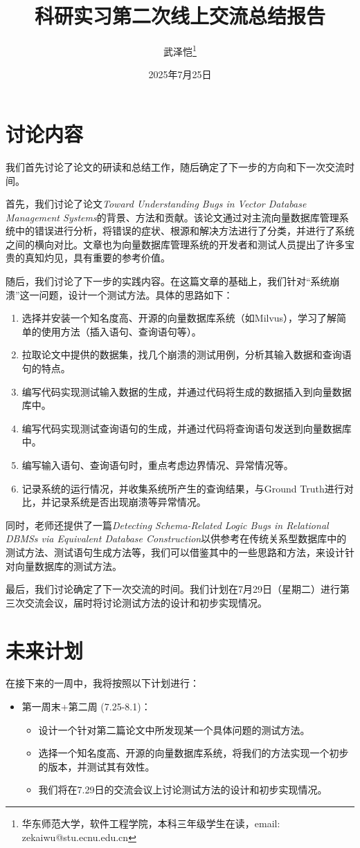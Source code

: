 \documentclass[UTF8]{ctexart}
\title{\heiti 科研实习第二次线上交流总结报告}
\author{武泽恺\footnote{华东师范大学，软件工程学院，本科三年级学生在读，email: zekaiwu@stu.ecnu.edu.cn}}
\date{2025年7月25日}
\begin{document}
\maketitle

\section{讨论内容}

我们首先讨论了论文的研读和总结工作，随后确定了下一步的方向和下一次交流时间。

首先，我们讨论了论文\textit{Toward Understanding Bugs in Vector Database Management Systems}的背景、方法和贡献。该论文通过对主流向量数据库管理系统中的错误进行分析，将错误的症状、根源和解决方法进行了分类，并进行了系统之间的横向对比。文章也为向量数据库管理系统的开发者和测试人员提出了许多宝贵的真知灼见，具有重要的参考价值。

随后，我们讨论了下一步的实践内容。在这篇文章的基础上，我们针对“系统崩溃”这一问题，设计一个测试方法。具体的思路如下：

\begin{enumerate}[itemsep=0pt]
    \item 选择并安装一个知名度高、开源的向量数据库系统（如Milvus），学习了解简单的使用方法（插入语句、查询语句等）。
    \item 拉取论文中提供的数据集，找几个崩溃的测试用例，分析其输入数据和查询语句的特点。
    \item 编写代码实现测试输入数据的生成，并通过代码将生成的数据插入到向量数据库中。
    \item 编写代码实现测试查询语句的生成，并通过代码将查询语句发送到向量数据库中。
    \item 编写输入语句、查询语句时，重点考虑边界情况、异常情况等。
    \item 记录系统的运行情况，并收集系统所产生的查询结果，与Ground Truth进行对比，并记录系统是否出现崩溃等异常情况。
\end{enumerate}

同时，老师还提供了一篇\textit{Detecting Schema-Related Logic Bugs in Relational DBMSs via Equivalent Database Construction}以供参考在传统关系型数据库中的测试方法、测试语句生成方法等，我们可以借鉴其中的一些思路和方法，来设计针对向量数据库的测试方法。

最后，我们讨论确定了下一次交流的时间。我们计划在7月29日（星期二）进行第三次交流会议，届时将讨论测试方法的设计和初步实现情况。

\section{未来计划}

在接下来的一周中，我将按照以下计划进行：

\begin{itemize}
    \item 第一周末+第二周 (7.25-8.1)：
    \begin{itemize}
        \item 设计一个针对第二篇论文中所发现某一个具体问题的测试方法。
        \item 选择一个知名度高、开源的向量数据库系统，将我们的方法实现一个初步的版本，并测试其有效性。
        \item 我们将在7.29日的交流会议上讨论测试方法的设计和初步实现情况。
    \end{itemize}
\end{itemize}
\end{document}
